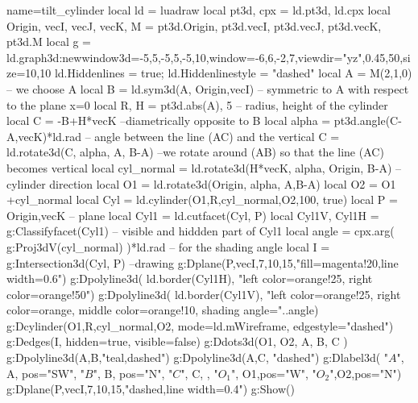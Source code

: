 \documentclass{standalone}
\begin{document}
\begin{luadraw}{name=tilt_cylinder}
local ld = luadraw
local pt3d, cpx = ld.pt3d, ld.cpx
local Origin, vecI, vecJ, vecK, M = pt3d.Origin, pt3d.vecI, pt3d.vecJ, pt3d.vecK, pt3d.M
local g = ld.graph3d:new{window3d={-5,5,-5,5,-5,10},window={-6,6,-2,7},viewdir={"yz",0.45,50},size={10,10}}
ld.Hiddenlines = true; ld.Hiddenlinestyle = "dashed"
local A = M(2,1,0) -- we choose A 
local B = ld.sym3d(A, {Origin,vecI}) -- symmetric to A with respect to the plane x=0
local R, H = pt3d.abs(A), 5 -- radius, height of the cylinder
local C = -B+H*vecK --diametrically opposite to B
local alpha = pt3d.angle(C-A,vecK)*ld.rad -- angle between the line (AC) and the vertical
C = ld.rotate3d(C, alpha, {A, B-A}) --we rotate around (AB) so that the line (AC) becomes vertical
local cyl_normal = ld.rotate3d(H*vecK, alpha, {Origin, B-A}) -- cylinder direction
local O1 = ld.rotate3d(Origin, alpha, {A,B-A})
local O2 = O1 +cyl_normal
local Cyl = ld.cylinder(O1,R,cyl_normal,O2,100, true)
local P = {Origin,vecK} -- plane
local Cyl1 = ld.cutfacet(Cyl, P)
local Cyl1V, Cyl1H = g:Classifyfacet(Cyl1) -- visible and hiddden part of Cyl1
local angle = cpx.arg( g:Proj3dV(cyl_normal) )*ld.rad -- for the shading angle
local I = g:Intersection3d(Cyl, P)
--drawing
g:Dplane(P,vecI,7,10,15,"fill=magenta!20,line width=0.6")
g:Dpolyline3d( ld.border(Cyl1H), "left color=orange!25, right color=orange!50")
g:Dpolyline3d( ld.border(Cyl1V), "left color=orange!25, right color=orange, middle color=orange!10, shading angle="..angle)
g:Dcylinder(O1,R,cyl_normal,O2, {mode=ld.mWireframe, edgestyle="dashed"})
g:Dedges(I, {hidden=true, visible=false})
g:Ddots3d({O1, O2, A, B, C} )
g:Dpolyline3d({A,B},"teal,dashed")
g:Dpolyline3d({A,C}, "dashed")
g:Dlabel3d( "$A$", A, {pos="SW"}, "$B$", B, {pos="N"}, "$C$", C, {}, "$O_1$", 
    O1,{pos="W"}, "$O_2$",O2,{pos="N"})
g:Dplane(P,vecI,7,10,15,"dashed,line width=0.4")
g:Show()
\end{luadraw}
\end{document}
